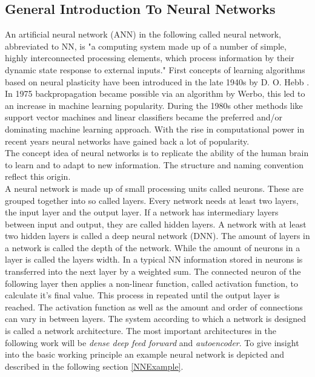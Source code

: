 		\subsection{General Introduction To Neural Networks}
			An artificial neural network (ANN) in the following called neural network, abbreviated to NN, is "a computing system made up of a number of simple, highly interconnected processing elements, which process information by their dynamic state response to external inputs." \cite{NNPrimer} %
			First concepts of learning algorithms based on neural plasticity have been introduced in the late 1940s by D. O. Hebb . In 1975 backpropagation became possible via an algorithm by Werbo, this led to an increase in machine learning popularity. During the 1980s other methods like support vector machines and linear classifiers became the preferred and/or dominating machine learning approach. With the rise in computational power in recent years neural networks have gained back a lot of popularity.\\
			The concept idea of neural networks is to replicate the ability of the human brain to learn and to adapt to new information. The structure and naming convention reflect this origin.\\
			A neural network is made up of small processing units called neurons. These are grouped together into so called layers. Every network needs at least two layers, the input layer and the output layer. If a network has intermediary layers between input and output, they are called hidden layers. A network with at least two hidden layers is called a deep neural network (DNN). The amount of layers in a network is called the depth of the network. While the amount of neurons in a layer is called the layers width.
			In a typical NN information stored in neurons is transferred into the next layer by a weighted sum. The connected neuron of the following layer then applies a non-linear function, called activation function, to calculate it's final value. This process in repeated until the output layer is reached. The activation function as well as the amount and order of connections can vary in between layers. The system according to which a network is designed is called a network architecture. The most important architectures in the following work will be \textit{dense deep feed forward} and \textit{autoencoder}. To give insight into the basic working principle an example neural network is depicted and described in the following section \ref{NNExample}.\\
